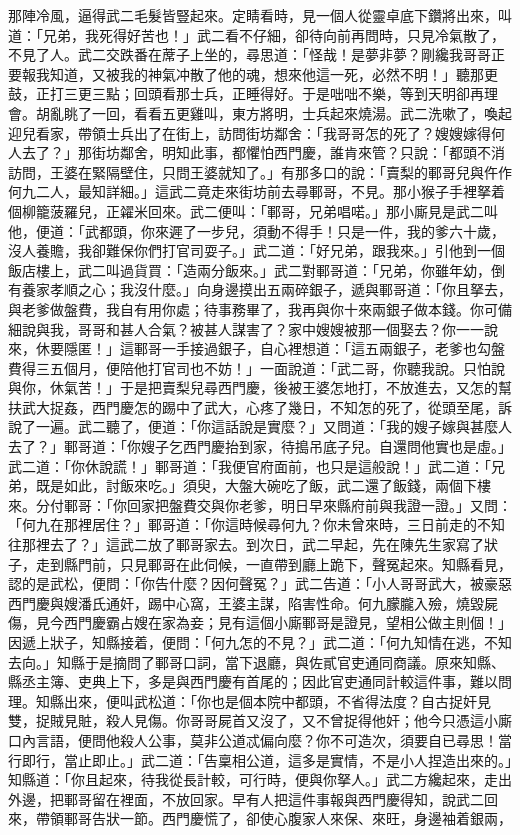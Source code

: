 \begin{showcontents}{}
那陣冷風，逼得武二毛髮皆豎起來。定睛看時，見一個人從靈卓底下鑽將出來，叫道：「兄弟，我死得好苦也！」武二看不仔細，卻待向前再問時，只見冷氣散了，不見了人。武二交跌番在蓆子上坐的，尋思道：「怪哉！是夢非夢？剛纔我哥哥正要報我知道，又被我的神氣冲散了他的魂，想來他這一死，必然不明！」聽那更鼓，正打三更三點；回頭看那士兵，正睡得好。于是咄咄不樂，等到天明卻再理會。胡亂眺了一回，看看五更雞叫，東方將明，士兵起來燒湯。武二洗嗽了，喚起迎兒看家，帶領士兵出了在街上，訪問街坊鄰舍：「我哥哥怎的死了？嫂嫂嫁得何人去了？」那街坊鄰舍，明知此事，都懼怕西門慶，誰肯來管？只說：「都頭不消訪問，王婆在緊隔壁住，只問王婆就知了。」有那多口的說：「賣梨的鄆哥兒與仵作何九二人，最知詳細。」這武二竟走來街坊前去尋鄆哥，不見。那小猴子手裡拏着個柳籠菠羅兒，正糴米回來。武二便叫：「鄆哥，兄弟唱喏。」那小廝見是武二叫他，便道：「武都頭，你來遲了一步兒，須動不得手！只是一件，我的爹六十歲，沒人養贍，我卻難保你們打官司耍子。」武二道：「好兄弟，跟我來。」引他到一個飯店樓上，武二叫過貨買：「造兩分飯來。」武二對鄆哥道：「兄弟，你雖年幼，倒有養家孝順之心；我沒什麼。」向身邊摸出五兩碎銀子，遞與鄆哥道：「你且拏去，與老爹做盤費，我自有用你處；待事務畢了，我再與你十來兩銀子做本錢。你可備細說與我，哥哥和甚人合氣？被甚人謀害了？家中嫂嫂被那一個娶去？你一一說來，休要隱匿！」這鄆哥一手接過銀子，自心裡想道：「這五兩銀子，老爹也勾盤費得三五個月，便陪他打官司也不妨！」一面說道：「武二哥，你聽我說。只怕說與你，休氣苦！」于是把賣梨兒尋西門慶，後被王婆怎地打，不放進去，又怎的幫扶武大捉姦，西門慶怎的踢中了武大，心疼了幾日，不知怎的死了，從頭至尾，訴說了一遍。武二聽了，便道：「你這話說是實麼？」又問道：「我的嫂子嫁與甚麼人去了？」鄆哥道：「你嫂子乞西門慶抬到家，待搗吊底子兒。自還問他實也是虛。」武二道：「你休說謊！」鄆哥道：「我便官府面前，也只是這般說！」武二道：「兄弟，既是如此，討飯來吃。」須臾，大盤大碗吃了飯，武二還了飯錢，兩個下樓來。分付鄆哥：「你回家把盤費交與你老爹，明日早來縣府前與我證一證。」又問：「何九在那裡居住？」鄆哥道：「你這時候尋何九？你未曾來時，三日前走的不知往那裡去了？」這武二放了鄆哥家去。到次日，武二早起，先在陳先生家寫了狀子，走到縣門前，只見鄆哥在此伺候，一直帶到廳上跪下，聲冤起來。知縣看見，認的是武松，便問：「你告什麼？因何聲冤？」武二告道：「小人哥哥武大，被豪惡西門慶與嫂潘氏通奸，踢中心窩，王婆主謀，陷害性命。何九朦朧入殮，燒毀屍傷，見今西門慶霸占嫂在家為妾；見有這個小廝鄆哥是證見，望相公做主則個！」因遞上狀子，知縣接着，便問：「何九怎的不見？」武二道：「何九知情在逃，不知去向。」知縣于是摘問了鄆哥口詞，當下退廳，與佐貳官吏通同商議。原來知縣、縣丞主簿、吏典上下，多是與西門慶有首尾的；因此官吏通同計較這件事，難以問理。知縣出來，便叫武松道：「你也是個本院中都頭，不省得法度？自古捉奸見雙，捉賊見賍，殺人見傷。你哥哥屍首又沒了，又不曾捉得他奸；他今只憑這小廝口內言語，便問他殺人公事，莫非公道忒偏向麼？你不可造次，須要自已尋思！當行即行，當止即止。」武二道：「告稟相公道，這多是實情，不是小人捏造出來的。」知縣道：「你且起來，待我從長計較，可行時，便與你拏人。」武二方纔起來，走出外邊，把鄆哥留在裡面，不放回家。早有人把這件事報與西門慶得知，說武二回來，帶領鄆哥告狀一節。西門慶慌了，卻使心腹家人來保、來旺，身邊袖着銀兩，
\end{showcontents}
